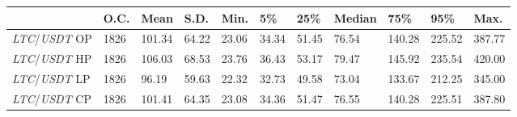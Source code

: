 \begin{tabular}{lllllllllll}
\toprule
 & \textbf{O.C.} & \textbf{Mean} & \textbf{S.D.} & \textbf{Min.} & \textbf{5\%} & \textbf{25\%} & \textbf{Median} & \textbf{75\%} & \textbf{95\%} & \textbf{Max.} \\
\midrule
\emph{LTC}/\emph{USDT} OP & 1826 & 101.34 & 64.22 & 23.06 & 34.34 & 51.45 & 76.54 & 140.28 & 225.52 & 387.77 \\
\emph{LTC}/\emph{USDT} HP & 1826 & 106.03 & 68.53 & 23.76 & 36.43 & 53.17 & 79.47 & 145.92 & 235.54 & 420.00 \\
\emph{LTC}/\emph{USDT} LP & 1826 & 96.19 & 59.63 & 22.32 & 32.73 & 49.58 & 73.04 & 133.67 & 212.25 & 345.00 \\
\emph{LTC}/\emph{USDT} CP & 1826 & 101.41 & 64.35 & 23.08 & 34.36 & 51.47 & 76.55 & 140.28 & 225.51 & 387.80 \\
\bottomrule
\end{tabular}
